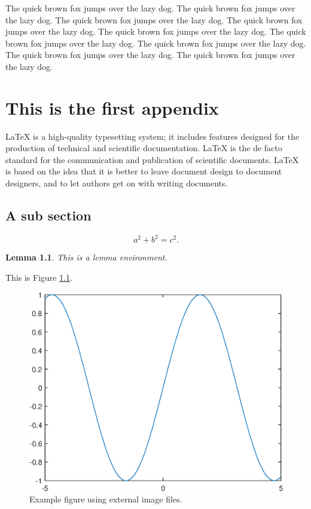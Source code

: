 \documentclass[openany,twoside,12pt]{book}
\theoremstyle{plain}
\newtheorem{lemma}{Lemma}[chapter]
\numberwithin{equation}{chapter}
\numberwithin{figure}{chapter}
\numberwithin{table}{chapter}
\begin{document}
The quick brown fox jumps over the lazy dog. The quick brown fox jumps over the lazy dog. The quick brown fox jumps over the lazy dog. The quick brown fox jumps over the lazy dog. The quick brown fox jumps over the lazy dog. The quick brown fox jumps over the lazy dog. The quick brown fox jumps over the lazy dog. The quick brown fox jumps over the lazy dog. The quick brown fox jumps over the lazy dog.



\appendix

\chapter{This is the first appendix}

LaTeX is a high-quality typesetting system; it includes features designed
for the production of technical and scientific documentation.
LaTeX is the de facto standard for the communication and publication of scientific documents.
LaTeX is based on the idea that it is better to leave document design to
document designers, and to let authors get on with writing documents.

\section{A sub section}

\begin{equation}\label{eq:abc}
  a^2+b^2=c^2.
\end{equation}

\begin{lemma}
This is a lemma environment.
\end{lemma}

This is Figure \ref{fig:aa}.
\begin{figure}[htp!]
  \centering
  \includegraphics[width=0.48\linewidth]{image1}
  \caption{Example figure using external image files.}
  \label{fig:aa}
\end{figure}
\end{document}
